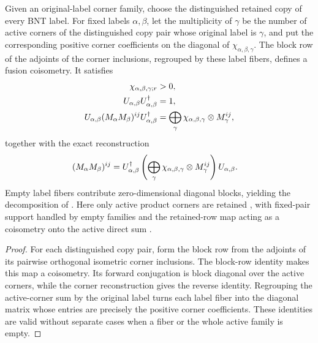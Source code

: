\begin{lemma}
    \label{thm:mpdo_original_corner_family_to_fusion_coisometry}
    \leanok
    Given an original-label corner family, choose the distinguished retained
    copy of every BNT label. For fixed
    labels $\alpha,\beta$, let the multiplicity of $\gamma$ be the number of
    active corners of the distinguished copy pair whose original label is
    $\gamma$, and put the corresponding positive corner coefficients on the
    diagonal of $\chi_{\alpha,\beta,\gamma}$. The block row of the adjoints
    of the corner inclusions, regrouped by these label fibers, defines a
    fusion coisometry. It satisfies
    \begin{align}
        \chi_{\alpha,\beta,\gamma;r}
         & >0,
        \notag               \\
        U_{\alpha,\beta}U_{\alpha,\beta}^\dagger
         & =1,
        \notag               \\
        U_{\alpha,\beta}(M_\alpha M_\beta)^{ij}
        U_{\alpha,\beta}^\dagger
         & =\bigoplus_\gamma
        \chi_{\alpha,\beta,\gamma}\otimes M_\gamma^{ij},
        \notag
    \end{align}
    together with the exact reconstruction
    \begin{align}
        (M_\alpha M_\beta)^{ij}
         & =U_{\alpha,\beta}^\dagger
        \left(\bigoplus_\gamma
        \chi_{\alpha,\beta,\gamma}\otimes M_\gamma^{ij}\right)
        U_{\alpha,\beta}.
        \notag
    \end{align}
    Empty label fibers contribute zero-dimensional diagonal blocks, yielding
    the decomposition of \cite[Appendix~C.4, lines~2020--2029]{Cirac2016MPDO_arXiv}.
    Here only active product corners are retained
    \cite{gap:cpsv16_bnt_uniqueness_zero_coefficient}, with fixed-pair support
    handled by empty families \cite{gap:cpsv16_figure11_per_pair_support}
    and the retained-row map acting as a coisometry onto the active direct sum
    \cite{gap:cpsv16_figure11_fusion_coisometry}.
\end{lemma}

\begin{proof}\leanok
    For each distinguished copy pair, form the block row from the adjoints of
    its pairwise orthogonal isometric corner inclusions. The block-row
    identity makes this map a coisometry. Its forward conjugation is block
    diagonal over the active corners, while the corner reconstruction gives
    the reverse identity. Regrouping the active-corner sum by the original
    label turns each label fiber into the diagonal matrix whose entries are
    precisely the positive corner coefficients. These identities are valid
    without separate cases when a fiber or the whole active family is empty.
\end{proof}

